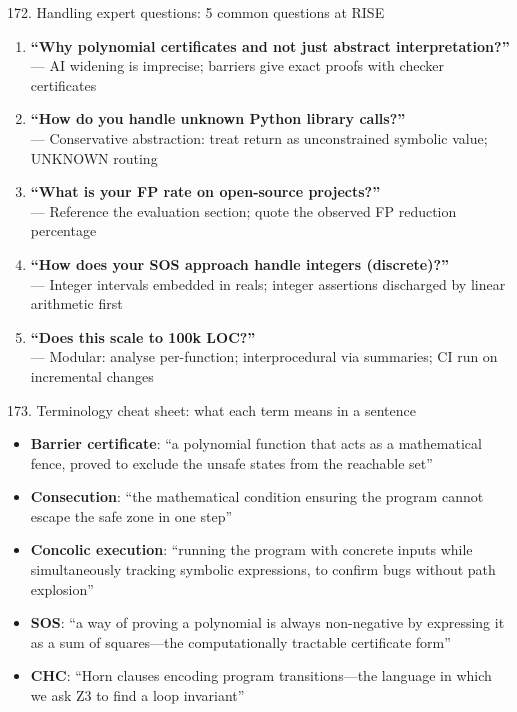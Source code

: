 \documentclass[aspectratio=169]{beamer}
\begin{document}
\begin{frame}{172. Handling expert questions: 5 common questions at RISE}
\begin{enumerate}
  \item \textbf{``Why polynomial certificates and not just abstract interpretation?''}\\
    --- AI widening is imprecise; barriers give exact proofs with checker certificates
  \item \textbf{``How do you handle unknown Python library calls?''}\\
    --- Conservative abstraction: treat return as unconstrained symbolic value; UNKNOWN routing
  \item \textbf{``What is your FP rate on open-source projects?''}\\
    --- Reference the evaluation section; quote the observed FP reduction percentage
  \item \textbf{``How does your SOS approach handle integers (discrete)?''}\\
    --- Integer intervals embedded in reals; integer assertions discharged by linear arithmetic first
  \item \textbf{``Does this scale to 100k LOC?''}\\
    --- Modular: analyse per-function; interprocedural via summaries; CI run on incremental changes
\end{enumerate}
\end{frame}

\begin{frame}{173. Terminology cheat sheet: what each term means in a sentence}
\begin{itemize}
  \item \textbf{Barrier certificate}: ``a polynomial function that acts as a mathematical fence,
    proved to exclude the unsafe states from the reachable set''
  \item \textbf{Consecution}: ``the mathematical condition ensuring the program cannot escape the safe zone in one step''
  \item \textbf{Concolic execution}: ``running the program with concrete inputs while simultaneously tracking symbolic expressions, to confirm bugs without path explosion''
  \item \textbf{SOS}: ``a way of proving a polynomial is always non-negative by expressing it as a sum of squares---the computationally tractable certificate form''
  \item \textbf{CHC}: ``Horn clauses encoding program transitions---the language in which we ask Z3 to find a loop invariant''
\end{itemize}
\end{frame}
\end{document}
